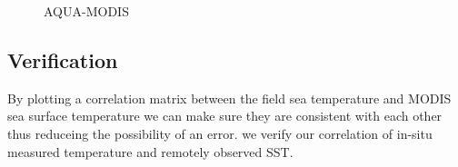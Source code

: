 \begin{figure}[H]
    \quad
    \label{fig:aqua_sst}
    \caption{AQUA-MODIS}
\end{figure}

\subsection{Verification}
    By plotting a correlation matrix between the field sea temperature and MODIS sea surface temperature we can make sure they are consistent with each other thus reduceing the possibility of an error.    
we verify our correlation of in-situ measured temperature and remotely observed SST.

